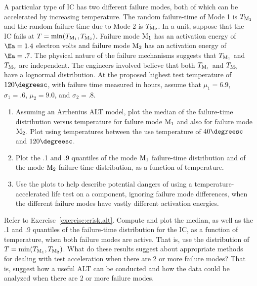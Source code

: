 \begin{exercise}
\label{exercise:crisk.alt}
A particular type of IC has two different failure modes, both of
which can be accelerated by increasing temperature.  The random
failure-time of Mode 1 is $T_{{\rm M}_{1}}$ and the
random failure time due to Mode 2 is $T_{{\rm M}_{2}}$. In a unit,
suppose that the IC fails at $T=\min(T_{{\rm M}_{1}},T_{{\rm
M}_{2}})$. Failure mode ${\rm M}_{1}$ has an activation energy of
$\Ea=1.4$ electron volts and failure mode ${\rm
M}_{2}$ has an activation energy of $\Ea=.7$.  The physical nature
of the failure mechanisms suggests that $T_{{\rm M}_{1}}$ and
$T_{{\rm M}_{2}}$ are independent. The engineers involved believe
that both $T_{{\rm M}_{1}}$ and $T_{{\rm M}_{2}}$ have a lognormal
distribution.  At the proposed highest test temperature of
$120\degreesc$, with failure time measured in hours, assume that
$\mu_{1}=6.9$, $\sigma_{1}=.6$, $\mu_{2}=9.0$, and $\sigma_{2}=.8$.
\begin{enumerate}
\item
Assuming an Arrhenius ALT model, plot the median of the failure-time
distribution versus temperature for failure mode ${\rm M}_{1}$ and also
for failure mode ${\rm M}_{2}$. Plot using temperatures between the use
temperature of $40\degreesc$ and $120\degreesc$.
\item
Plot the .1 and .9 quantiles of the mode ${\rm M}_{1}$
failure-time distribution and of the mode ${\rm M}_{2}$ failure-time
distribution, as a function of temperature.
\item
Use the plots to help describe potential dangers of using a
temperature-accelerated life test on a component, ignoring failure mode
differences, when the  different
failure modes have vastly different activation energies.
\end{enumerate}
\end{exercise}

\begin{exercise1}
Refer to Exercise~\ref{exercise:crisk.alt}.  Compute and plot the
median, as well as the .1 and .9 quantiles of the failure-time 
distribution for the IC, as a function of temperature, when
both failure modes are active. That is, use the distribution of
$T=\min(T_{{\rm M}_{1}},T_{{\rm M}_{2}})$.  What do these results
suggest about appropriate methods for dealing with test acceleration
when there are 2 or more failure modes?  That is, suggest how a useful
ALT can be conducted and how the data could be analyzed when there are
2 or more failure modes.
\end{exercise1}


